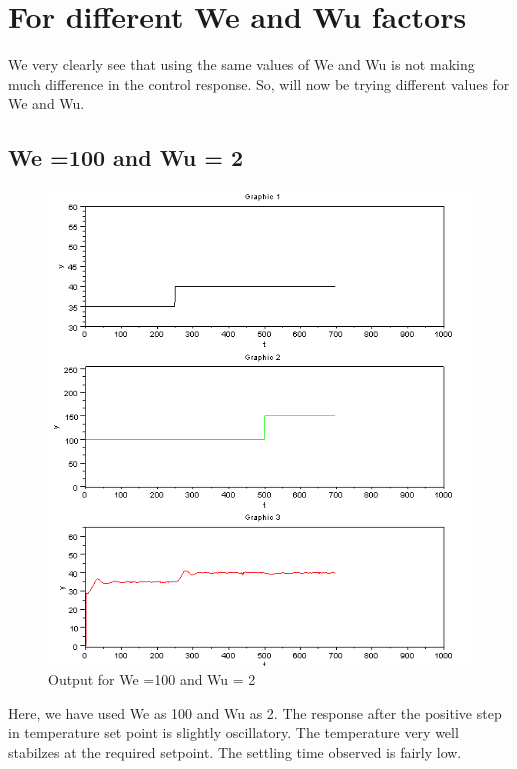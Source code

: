 \section{For different We and Wu factors}
We very clearly see that using the same values of We and Wu is not making much difference in the control response. So, will now be trying different values for We and Wu.
\subsection{We =100 and Wu = 2}
\begin{figure}[H]
\centering
  \includegraphics[width=0.8\linewidth]{mpc/5_1.PNG}
  \caption{Output for We =100 and Wu = 2}
\end{figure}
Here, we have used We as 100 and Wu as 2. The response after the positive step in temperature set point is slightly oscillatory. The temperature very well stabilzes at the required setpoint. The settling time observed is fairly low.

